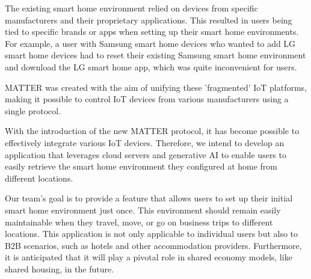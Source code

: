 \documentclass[conference]{IEEEtran}
\begin{document}
The existing smart home environment relied on devices from specific manufacturers and their proprietary applications. This resulted in users being tied to specific brands or apps when setting up their smart home environments. For example, a user with Samsung smart home devices who wanted to add LG smart home devices had to reset their existing Samsung smart home environment and download the LG smart home app, which was quite inconvenient for users.

MATTER was created with the aim of unifying these 'fragmented' IoT platforms, making it possible to control IoT devices from various manufacturers using a single protocol.

With the introduction of the new MATTER protocol, it has become possible to effectively integrate various IoT devices. Therefore, we intend to develop an application that leverages cloud servers and generative AI to enable users to easily retrieve the smart home environment they configured at home from different locations.

Our team's goal is to provide a feature that allows users to set up their initial smart home environment just once. This environment should remain easily maintainable when they travel, move, or go on business trips to different locations. This application is not only applicable to individual users but also to B2B scenarios, such as hotels and other accommodation providers. Furthermore, it is anticipated that it will play a pivotal role in shared economy models, like shared housing, in the future.
\end{document}
